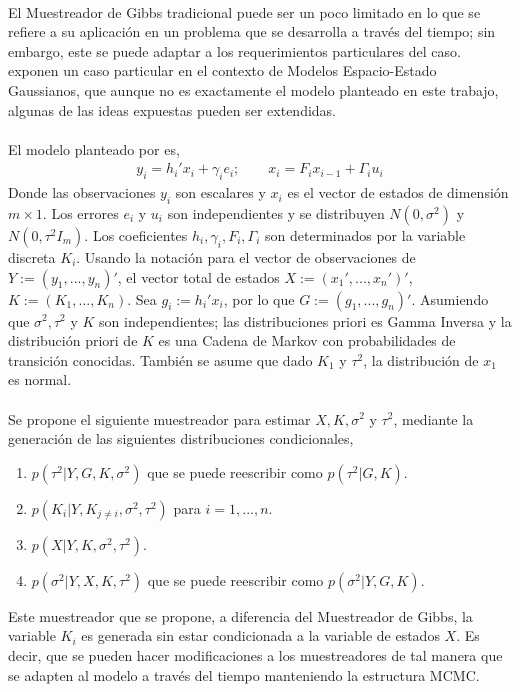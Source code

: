 \\
El Muestreador de Gibbs tradicional puede ser un poco limitado en lo que se refiere a su aplicaci\'on en un problema que se desarrolla a trav\'es del tiempo; sin embargo, este se puede adaptar a los requerimientos particulares del caso. \cite{carter1996markov} exponen un caso particular en el contexto de Modelos Espacio-Estado Gaussianos, que aunque no es exactamente el modelo planteado en este trabajo, algunas de las ideas expuestas pueden ser extendidas.\\
\\
El modelo planteado por \cite{carter1996markov} es,
\begin{align*}
y_i=h_i'x_i+\gamma_ie_i; \qquad x_i=F_ix_{i-1}+\Gamma_iu_i
\end{align*}
Donde las observaciones $y_i$ son escalares y $x_i$ es el vector de estados de dimensi\'on $m\times 1$. Los errores $e_i$ y $u_i$ son independientes y se distribuyen $N(0,\sigma^2)$ y $N(0,\tau^2I_m)$. Los coeficientes $h_i,\gamma_i,F_i,\Gamma_i$ son determinados por la variable discreta $K_i$. Usando la notaci\'on para el vector de observaciones de $Y:=(y_1,...,y_n)'$, el vector total de estados $X:=(x_1',...,x_n')'$, $K:=(K_1,...,K_n)$. Sea $g_i:=h_i'x_i$, por lo que $G:=(g_1,...,g_n)'$. Asumiendo que $\sigma^2, \tau^2$ y $K$ son independientes; las distribuciones priori es Gamma Inversa y la distribuci\'on priori de $K$ es una Cadena de Markov con probabilidades de transici\'on conocidas. Tambi\'en se asume que dado $K_1$ y $\tau^2$, la distribuci\'on de $x_1$ es normal.\\
\\
Se propone el siguiente muestreador para estimar $X,K,\sigma^2$ y $\tau^2$, mediante la generaci\'on de las siguientes distribuciones condicionales,
\begin{enumerate}
\item $p(\tau^2|Y,G,K,\sigma^2)$ que se puede reescribir como $p(\tau^2|G,K)$.
\item $p(K_i|Y,K_{j \neq i},\sigma^2,\tau^2)$ para $i=1,...,n$.
\item $p(X|Y,K,\sigma^2,\tau^2)$.
\item $p(\sigma^2|Y,X,K,\tau^2)$ que se puede reescribir como $p(\sigma^2|Y,G,K)$.
\end{enumerate}
Este muestreador que se propone, a diferencia del Muestreador de Gibbs, la variable $K_i$ es generada sin estar condicionada a la variable de estados $X$. Es decir, que se pueden hacer modificaciones a los muestreadores de tal manera que se adapten al modelo a trav\'es del tiempo manteniendo la estructura MCMC.\\
